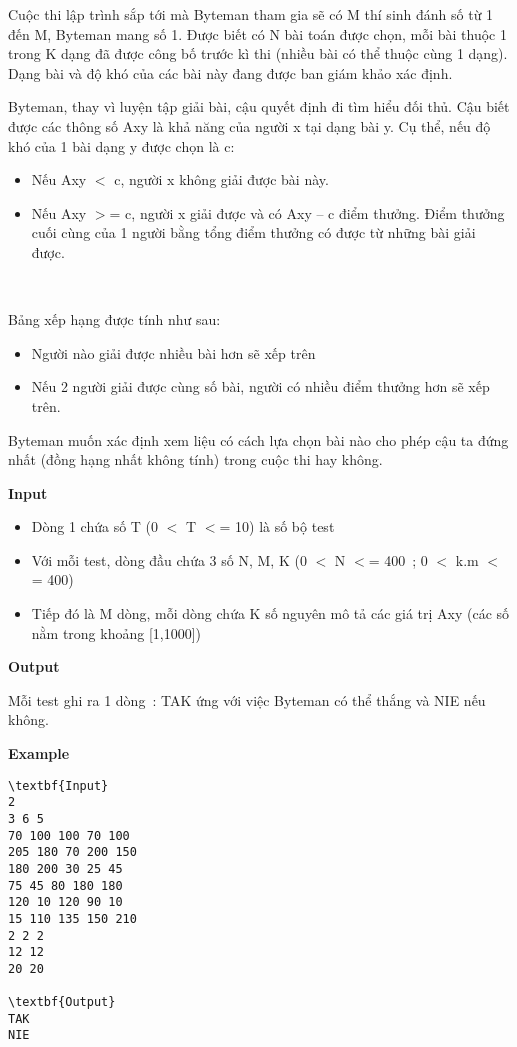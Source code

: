 

Cuộc thi lập trình sắp tới mà Byteman tham gia sẽ có M thí sinh đánh số từ 1 đến M, Byteman mang số 1. Được biết có N bài toán được chọn, mỗi bài thuộc 1 trong K dạng đã được công bố trước kì thi (nhiều bài có thể thuộc cùng 1 dạng). Dạng bài và độ khó của các bài này đang được ban giám khảo xác định.

Byteman, thay vì luyện tập giải bài, cậu quyết định đi tìm hiểu đối thủ. Cậu biết được các thông số Axy là khả năng của người x tại dạng bài y. Cụ thể, nếu độ khó của 1 bài dạng y được chọn là c:
\begin{itemize}
	\item Nếu Axy $<$ c, người x không giải được bài này.
	\item Nếu Axy $>$= c, người x giải được và có Axy – c điểm thưởng. Điểm thưởng cuối cùng của 1 người bằng tổng điểm thưởng có được từ những bài giải được.
\end{itemize}

 

Bảng xếp hạng được tính như sau:
\begin{itemize}
	\item Người nào giải được nhiều bài hơn sẽ xếp trên
	\item Nếu 2 người giải được cùng số bài, người có nhiều điểm thưởng hơn sẽ xếp trên.
\end{itemize}

Byteman muốn xác định xem liệu có cách lựa chọn bài nào cho phép cậu ta đứng nhất (đồng hạng nhất không tính) trong cuộc thi hay không.

\textbf{Input}
\begin{itemize}
	\item Dòng 1 chứa số T (0 $<$ T $<$= 10) là số bộ test
	\item Với mỗi test, dòng đầu chứa 3 số N, M, K (0 $<$ N $<$= 400 ; 0 $<$ k.m $<$= 400)
	\item Tiếp đó là M dòng, mỗi dòng chứa K số nguyên mô tả các giá trị Axy (các số nằm trong khoảng [1,1000])
\end{itemize}

\textbf{Output}

Mỗi test ghi ra 1 dòng : TAK ứng với việc Byteman có thể thắng và NIE nếu không.

\textbf{Example}
\begin{verbatim}
\textbf{Input}
2
3 6 5
70 100 100 70 100
205 180 70 200 150
180 200 30 25 45
75 45 80 180 180
120 10 120 90 10
15 110 135 150 210
2 2 2
12 12
20 20

\textbf{Output}
TAK
NIE
\end{verbatim}

